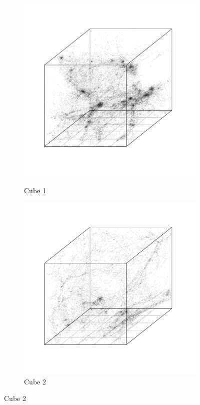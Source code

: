 \documentclass[12pt]{article}
\begin{document}
\begin{figure}[htp!]
  \centering
  \begin{subfigure}{0.31\textwidth}
    \centering
        \caption{Cube 1}
  \includegraphics[width=\linewidth]{figure_10_cdm_slice_17.pdf}
    \label{fig:cubeDiagsA}
  \end{subfigure}
    \begin{subfigure}{0.31\textwidth}
    \centering
        \caption{Cube 2}
  \includegraphics[width=\linewidth]{figure_10_cdm_slice_34.pdf}

\end{subfigure}
\end{figure}
\end{document}

